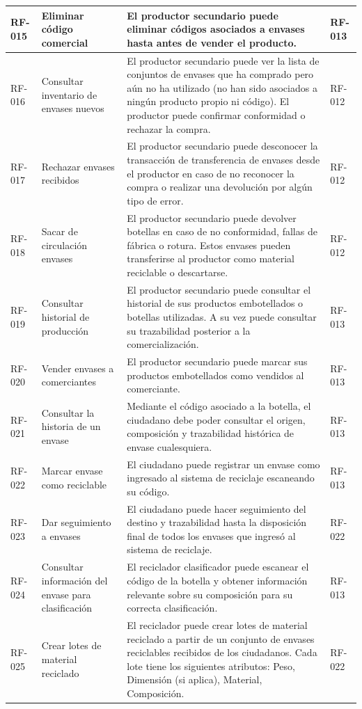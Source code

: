 \begin{xltabular}{\textwidth}{@{} L{1.3cm} L{2.5cm} Y L{1.5cm} @{}}
	\hline
	RF-015 & Eliminar código comercial & El productor secundario puede eliminar códigos asociados a envases hasta antes de vender el producto. & RF-013 \\
	\hline
	RF-016 & Consultar inventario de envases nuevos & El productor secundario puede ver la lista de conjuntos de envases que ha comprado pero aún no ha utilizado (no han sido asociados a ningún producto propio ni código). El productor puede confirmar conformidad o rechazar la compra. & RF-012 \\
	\hline
	RF-017 & Rechazar envases recibidos & El productor secundario puede desconocer la transacción de transferencia de envases desde el productor en caso de no reconocer la compra o realizar una devolución por algún tipo de error. & RF-012 \\
	\hline
	RF-018 & Sacar de circulación envases & El productor secundario puede devolver botellas en caso de no conformidad, fallas de fábrica o rotura. Estos envases pueden transferirse al productor como material reciclable o descartarse. & RF-012 \\
	\hline
	RF-019 & Consultar historial de producción & El productor secundario puede consultar el historial de sus productos embotellados o botellas utilizadas. A su vez puede consultar su trazabilidad posterior a la comercialización. & RF-013 \\
	\hline
	RF-020 & Vender envases a comerciantes & El productor secundario puede marcar sus productos embotellados como vendidos al comerciante. & RF-013 \\
	\hline
	RF-021 & Consultar la historia de un envase & Mediante el código asociado a la botella, el ciudadano debe poder consultar el origen, composición y trazabilidad histórica de envase cualesquiera. & RF-013 \\
	\hline
	RF-022 & Marcar envase como reciclable & El ciudadano puede registrar un envase como ingresado al sistema de reciclaje escaneando su código. & RF-013 \\
	\hline
	RF-023 & Dar seguimiento a envases & El ciudadano puede hacer seguimiento del destino y trazabilidad hasta la disposición final de todos los envases que ingresó al sistema de reciclaje. & RF-022 \\
	\hline
	RF-024 & Consultar información del envase para clasificación & El reciclador clasificador puede escanear el código de la botella y obtener información relevante sobre su composición para su correcta clasificación. & RF-013 \\
	\hline
	RF-025 & Crear lotes de material reciclado & El reciclador puede crear lotes de material reciclado a partir de un conjunto de envases reciclables recibidos de los ciudadanos. Cada lote tiene los siguientes atributos: Peso, Dimensión (si aplica), Material, Composición. & RF-022 \\

\end{xltabular}
